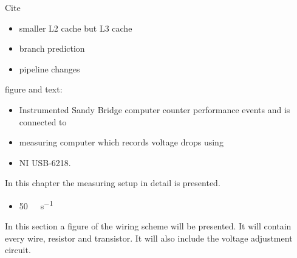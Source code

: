 Cite \cite{fog11}

\begin{itemize}

\item smaller L2 cache but L3 cache

\item branch prediction

\item pipeline changes

\end{itemize}


\label{sec:big-pic}

figure and text:

\begin{itemize}

\item Instrumented Sandy Bridge computer counter performance events and is 
      connected to

\item measuring computer which records voltage drops using

\item NI USB-6218.

\end{itemize}

\label{sec:measuring-setup}

In this chapter the measuring setup in detail is presented.



\begin{itemize}

\item \SI{50}{\kilo\samples\per\second}

\end{itemize}



In this section a figure of the wiring scheme will be presented. It will contain
every wire, resistor and transistor. It will also include the voltage adjustment
circuit.


\label{sec:measuring-device}

